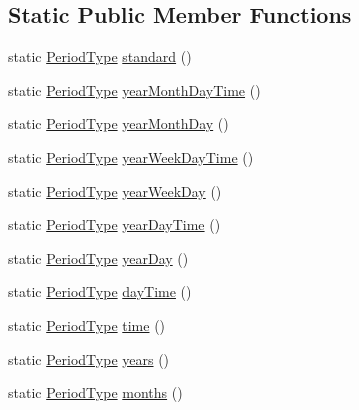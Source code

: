 \subsection*{Static Public Member Functions}
\begin{DoxyCompactItemize}
\item 
static \hyperlink{classorg_1_1joda_1_1time_1_1_period_type}{Period\-Type} \hyperlink{classorg_1_1joda_1_1time_1_1_period_type_af1a01c240964b6637015cb364ec71a35}{standard} ()
\item 
static \hyperlink{classorg_1_1joda_1_1time_1_1_period_type}{Period\-Type} \hyperlink{classorg_1_1joda_1_1time_1_1_period_type_aabceaf40c5298ad62a0a5122d14e9d6e}{year\-Month\-Day\-Time} ()
\item 
static \hyperlink{classorg_1_1joda_1_1time_1_1_period_type}{Period\-Type} \hyperlink{classorg_1_1joda_1_1time_1_1_period_type_a65b599242e877bbd1b04ccf06f7577c5}{year\-Month\-Day} ()
\item 
static \hyperlink{classorg_1_1joda_1_1time_1_1_period_type}{Period\-Type} \hyperlink{classorg_1_1joda_1_1time_1_1_period_type_a46c849586721f0ffce18cc4c184c32fc}{year\-Week\-Day\-Time} ()
\item 
static \hyperlink{classorg_1_1joda_1_1time_1_1_period_type}{Period\-Type} \hyperlink{classorg_1_1joda_1_1time_1_1_period_type_a580b24cce97f8e392481163decdafbbe}{year\-Week\-Day} ()
\item 
static \hyperlink{classorg_1_1joda_1_1time_1_1_period_type}{Period\-Type} \hyperlink{classorg_1_1joda_1_1time_1_1_period_type_a5e13fbcbef4644d9e0ad965e4c653b69}{year\-Day\-Time} ()
\item 
static \hyperlink{classorg_1_1joda_1_1time_1_1_period_type}{Period\-Type} \hyperlink{classorg_1_1joda_1_1time_1_1_period_type_a5d7b864d91d712dd7457e2ec0a213bb9}{year\-Day} ()
\item 
static \hyperlink{classorg_1_1joda_1_1time_1_1_period_type}{Period\-Type} \hyperlink{classorg_1_1joda_1_1time_1_1_period_type_afd8eae969c4fd2cbae463bd9ad20efc3}{day\-Time} ()
\item 
static \hyperlink{classorg_1_1joda_1_1time_1_1_period_type}{Period\-Type} \hyperlink{classorg_1_1joda_1_1time_1_1_period_type_a5292471abdedb072a1693e0fd0325074}{time} ()
\item 
static \hyperlink{classorg_1_1joda_1_1time_1_1_period_type}{Period\-Type} \hyperlink{classorg_1_1joda_1_1time_1_1_period_type_afbb59f62dc366ae1ae4957c77832950b}{years} ()
\item 
static \hyperlink{classorg_1_1joda_1_1time_1_1_period_type}{Period\-Type} \hyperlink{classorg_1_1joda_1_1time_1_1_period_type_ac2c00aeb3e334a6ab14878e9f52de878}{months} ()

\end{DoxyCompactItemize}
